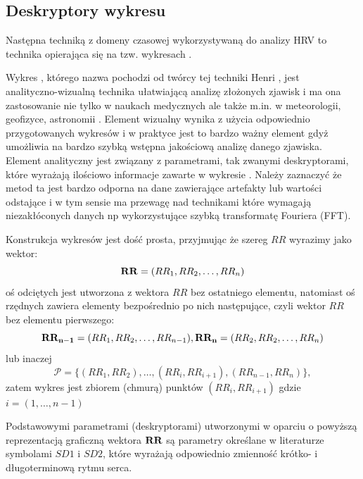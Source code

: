 \subsection{Deskryptory wykresu \PP{}}


Następna techniką z domeny czasowej wykorzystywaną do analizy HRV to technika opierająca
się na tzw. wykresach \PP{}.

Wykres \PP{}, którego nazwa pochodzi od twórcy tej techniki Henri \PP{}, jest\\ 
analityczno-wizualną technika ułatwiającą analizę złożonych zjawisk i ma ona zastosowanie
nie tylko w naukach medycznych ale także m.in. w meteorologii, geofizyce, astronomii \cite{ott}.
Element wizualny wynika z użycia odpowiednio przygotowanych wykresów i w praktyce jest to
bardzo ważny element gdyż umożliwia na bardzo szybką wstępna jakościową analizę danego
zjawiska. Element analityczny jest związany z parametrami, tak zwanymi deskryptorami,
które wyrażają ilościowo informacje zawarte w wykresie \PP{}. Należy zaznaczyć że
metod ta jest bardzo odporna na dane zawierające artefakty lub wartości odstające i w
tym sensie ma przewagę nad technikami które wymagają niezakłóconych danych np 
wykorzystujące szybką transformatę Fouriera (FFT).

Konstrukcja wykresów \PP{} jest dość prosta, przyjmując że szereg $RR$ wyrazimy jako
wektor:
\begin{equation}
\mathbf{RR} = (RR_{1}, RR_{2}, \ldots, RR_{n})
\end{equation}
oś odciętych jest utworzona z wektora $RR$ bez ostatniego elementu, natomiast oś rzędnych
zawiera elementy bezpośrednio po nich następujące, czyli wektor $RR$ bez elementu
pierwszego:
\begin{equation}
\mathbf{RR_{n-1}} = (RR_{1}, RR_{2}, \ldots, RR_{n-1}),
\mathbf{RR_n} = (RR_{2}, RR_{2}, \ldots, RR_{n}) 
\end{equation}
lub inaczej
\begin{equation}
  \mathcal{P} = \{(RR_1, RR_2),\ldots, (RR_i, RR_{i+1}), (RR_{n-1}, RR_n )\},
 \label{eq:p_plot}
\end{equation}
zatem wykres \PP{} jest zbiorem (chmurą) punktów $(RR_{i}, RR_{i+1})$ gdzie $i=(1, \ldots, n-1)$

Podstawowymi parametrami (deskryptorami) utworzonymi w oparciu o powyższą reprezentacją 
graficzną wektora $\mathbf{RR}$ są parametry określane w literaturze symbolami $SD1$ i $SD2$, które
wyrażają odpowiednio zmienność krótko- i długoterminową rytmu serca.

